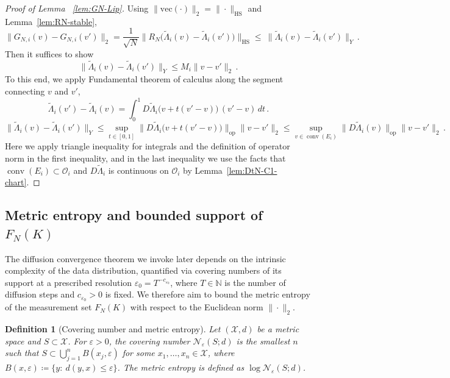 \documentclass{article}
\newtheorem{definition}{Definition}[section]
\begin{document}
\begin{proof}[Proof of Lemma ~\ref{lem:GN-Lip}]
Using $\|\mathrm{vec}(\cdot)\|_2=\|\cdot\|_{\mathrm{HS}}$ and Lemma~\ref{lem:RN-stable},
\[
\|G_{N,i}(v)-G_{N,i}(v')\|_2
=\frac{1}{\sqrt{N}}\big\|R_N\big(\widetilde\Lambda_i(v)-\widetilde\Lambda_i(v')\big)\big\|_{\mathrm{HS}}
\le\ \|\widetilde\Lambda_i(v)-\widetilde\Lambda_i(v')\|_Y\,.
\]
Then it suffices to show
\[
\|\widetilde\Lambda_i(v)-\widetilde\Lambda_i(v')\|_Y\le M_i\|v-v'\|_2\,.
\]
To this end, we apply Fundamental theorem of calculus along the segment connecting $v$ and $v'$, 
\[
\widetilde\Lambda_i(v')-\widetilde\Lambda_i(v)=\int_0^1 D\widetilde\Lambda_i\big(v+t(v'-v)\big)\,(v'-v)\,dt\,.
\]
\[
\|\widetilde\Lambda_i(v)-\widetilde\Lambda_i(v')\|_Y\le \sup_{t\in[0,1]}\|D\widetilde\Lambda_i\big(v+t(v'-v)\big) \|_{\mathrm{op}}\|v-v'\|_2 \leq \sup_{v\in \operatorname{conv}(E_i)}\big\|D\widetilde\Lambda_i(v)\big\|_{\mathrm{op}} \|v-v'\|_2 \,.
\]
Here we apply triangle inequality for integrals and the definition of operator norm in the first inequality, and in the last inequality we use the facts that $\operatorname{conv}(E_i)\subset \mathcal O_i$ and $D\widetilde\Lambda_i$ is continuous on $\mathcal O_i$ by Lemma~\ref{lem:DtN-C1-chart}.


\end{proof}
\subsection{Metric entropy and bounded support of $F_N(K)$}\label{sec:entropy-bdd-FN}
The diffusion convergence theorem we invoke later depends on the intrinsic complexity of the data
distribution, quantified via covering numbers of its support at a prescribed resolution
$\varepsilon_0 = T^{-c_{\varepsilon_0}}$, where $T\in\mathbb{N}$ is the number of diffusion steps and
$c_{\varepsilon_0}>0$ is fixed.
We therefore aim to bound the metric entropy of the measurement set $F_N(K)$ with respect to the
Euclidean norm $\|\cdot\|_2$.

\begin{definition}[Covering number and metric entropy]\label{def:covering}
Let $(\mathcal{X},d)$ be a metric space and $S\subset\mathcal{X}$.
For $\varepsilon>0$, the covering number $\mathcal{N}_\varepsilon(S;d)$ is the smallest $n$ such that
$S\subset\bigcup_{j=1}^n B(x_j,\varepsilon)$ for some $x_1,\dots,x_n\in\mathcal{X}$, where
$B(x,\varepsilon)\coloneqq \{y:\ d(y,x)\le\varepsilon\}$.
The metric entropy is defined as $\log \mathcal{N}_\varepsilon(S;d)$.
\end{definition}
\end{document}
